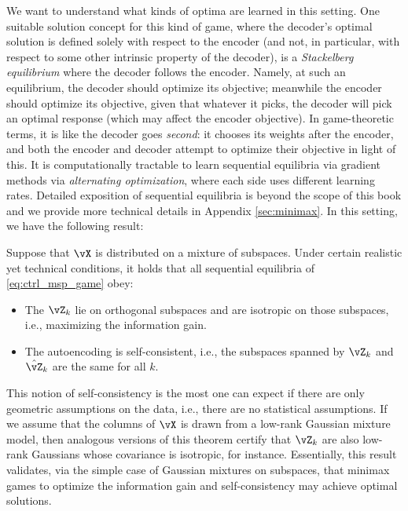 \documentclass[../../book-main.tex]{subfiles}
\begin{document}
We want to understand what kinds of optima are learned in this setting. One suitable solution concept for this kind of game, where the decoder's optimal solution is defined solely with respect to the encoder (and not, in particular, with respect to some other intrinsic property of the decoder), is a \textit{Stackelberg equilibrium} where the decoder follows the encoder. %
Namely, at such an equilibrium, the decoder should optimize its objective; meanwhile the encoder should optimize its objective, given that whatever it picks, the decoder will pick an optimal response (which may affect the encoder objective). In game-theoretic terms, it is like the decoder goes \textit{second}: it chooses its weights after the encoder, and both the encoder and decoder attempt to optimize their objective in light of this. It is computationally tractable to learn sequential equilibria via gradient methods via \textit{alternating optimization}, where each side uses different learning rates. Detailed exposition of sequential equilibria is beyond the scope of this book and we provide more technical details in Appendix \ref{sec:minimax}. In this setting, we have the following result:
\begin{theorem}\label{thm:ctrl_theory}
    Suppose that \(\vX\) is distributed on a mixture of subspaces. Under certain realistic yet technical conditions, it holds that all sequential equilibria of \eqref{eq:ctrl_msp_game} obey:
    \begin{itemize}
        \item The \(\vZ_{k}\) lie on orthogonal subspaces and are isotropic on those subspaces, i.e., maximizing the information gain.
        \item The autoencoding is self-consistent, i.e., the subspaces spanned by \(\vZ_{k}\) and \(\hat{\vZ}_{k}\) are the same for all \(k\).
    \end{itemize}
\end{theorem}
This notion of self-consistency is the most one can expect if there are only geometric assumptions on the data, i.e., there are no statistical assumptions. If we assume that the columns of \(\vX\) is drawn from a low-rank Gaussian mixture model, then analogous versions of this theorem certify that \(\vZ_{k}\) are also low-rank Gaussians whose covariance is isotropic, for instance. %
Essentially, this result validates, via the simple case of Gaussian mixtures on subspaces, that minimax games to optimize the information gain and self-consistency may achieve optimal solutions.
\end{document}
